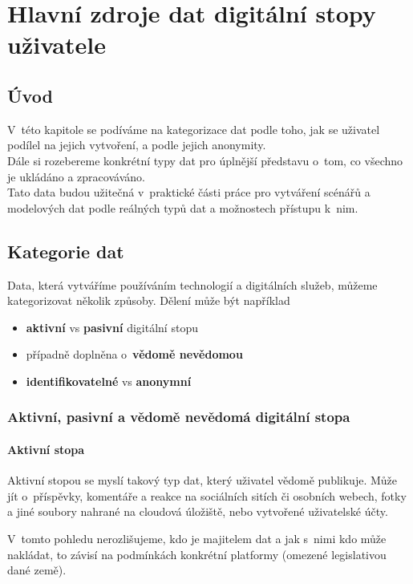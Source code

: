 \chapter{Hlavní zdroje dat digitální stopy uživatele}

\section{Úvod}
V~této kapitole se podíváme na kategorizace dat podle toho, jak se uživatel podílel na jejich vytvoření, a podle jejich anonymity.\\
Dále si rozebereme konkrétní typy dat pro úplnější představu o~tom, co všechno je ukládáno a zpracováváno.\\
Tato data budou užitečná v~praktické části práce pro vytváření scénářů a modelových dat podle reálných typů dat a možnostech přístupu k~nim.

\section{Kategorie dat}
Data, která vytváříme používáním technologií a digitálních služeb, můžeme kategorizovat několik způsoby. Dělení může být například
\begin{itemize}
	\item \textbf{aktivní} vs \textbf{pasivní} digitální stopu \citep{pew-digital-footprint}
    \item případně doplněna o~\textbf{vědomě nevědomou} \citep{fish-digital-footprint}
\item \textbf{identifikovatelné} vs \textbf{anonymní}
\end{itemize}


\subsection{Aktivní, pasivní a vědomě nevědomá digitální stopa}
\subsubsection{Aktivní stopa}
Aktivní stopou se myslí takový typ dat, který uživatel vědomě publikuje. Může jít o~příspěvky, komentáře a reakce na sociálních sitích či osobních webech, fotky a jiné soubory nahrané na cloudová úložiště, nebo vytvořené uživatelské účty.\citep{pew-digital-footprint}

V~tomto pohledu nerozlišujeme, kdo je majitelem dat a jak s~nimi kdo může nakládat, to závisí na podmínkách konkrétní platformy (omezené legislativou dané země).

